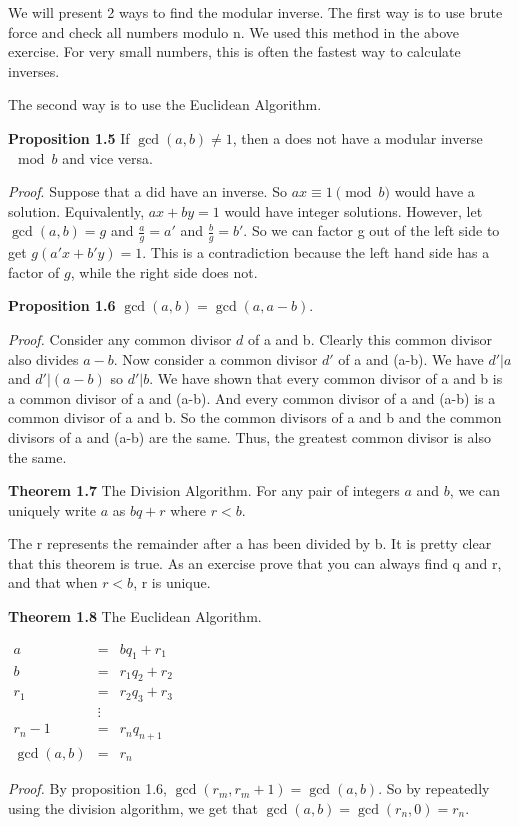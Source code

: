 \documentclass{article}
\begin{document}
We will present 2 ways to find the modular inverse. 
The first way is to use brute force and check all numbers modulo n. We used this
method in the above exercise. For very small numbers, this is often the fastest way to calculate inverses.

The second way is to use the Euclidean Algorithm.
\begin{mdframed}
    \textbf{Proposition 1.5} If $\gcd{(a,b)}\neq 1$, then a does not have a modular inverse $\mod b$ and vice versa.
\end{mdframed}
\emph{Proof}. Suppose that a did have an inverse. So $ax \equiv 1 \pmod{b}$ would have a solution. Equivalently, $ax+by = 1$ would have integer solutions. 
However, let $\gcd(a,b) = g$ and $\frac{a}{g} = a'$ and $\frac{b}{g} = b'$. So we can factor g out of the left side to get $g(a'x+b'y) = 1$. This is a contradiction
because the left hand side has a factor of $g$, while the right side does not.

\begin{mdframed}
    \textbf{Proposition 1.6} $\gcd(a,b) = \gcd(a,a-b)$.
\end{mdframed}
\emph{Proof.} Consider any common divisor $d$ of a and b. Clearly this common divisor also divides $a-b$.
Now consider a common divisor $d'$ of a and (a-b). We have $d'|a$ and $d' | (a-b)$ so $d'|b$. We have shown that every common divisor of a and b is a common divisor of a and (a-b). 
And every common divisor of a and (a-b) is a common divisor of a and b. So the common divisors of a and b and the common divisors of a and (a-b) are the same. Thus, the greatest common divisor is also the same.

\begin{mdframed}
    \textbf{Theorem 1.7} The Division Algorithm. For any pair of integers $a$ and $b$, we can uniquely write $a$ as $bq + r$ where $r<b$.
\end{mdframed}
The r represents the remainder after a has been divided by b. It is pretty clear that this theorem is true. As an exercise prove that you can always find q and r, 
and that when $r < b$, r is unique.
\newline
\newline
\newline
\newline

\begin{mdframed}
    \textbf{Theorem 1.8} The Euclidean Algorithm. 
    \begin{center}
        $\begin{array}{rcl}
            a &= &bq_1 + r_1\\
            b &= &r_1q_2 + r_2\\
            r_1 &= &r_2q_3 + r_3\\
            &\vdots\\
            r_n-1 &= &r_nq_{n+1}\\
            \gcd(a,b) &= &r_n
        \end{array}$
    \end{center}
\end{mdframed}
\emph{Proof.} By proposition 1.6, $\gcd(r_m,r_m+1) = \gcd(a,b)$. So by repeatedly using the division algorithm, we get that $\gcd(a,b) = \gcd(r_n,0) = r_n$.
\end{document}
